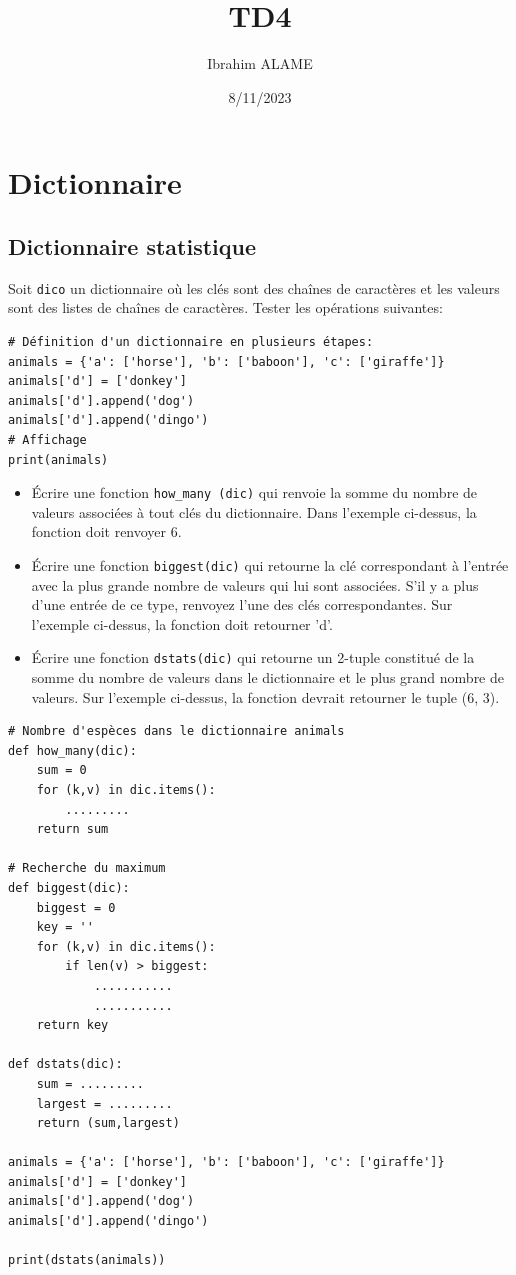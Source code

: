 \documentclass[a4paper]{article}
\title{TD4}
\author{Ibrahim ALAME}
\date{8/11/2023}
\begin{document}
\maketitle
\section{Dictionnaire}
\subsection{Dictionnaire statistique}
 Soit {\tt dico} un dictionnaire où les clés sont des chaînes de caractères et les valeurs sont des listes de chaînes de caractères. Tester les opérations  suivantes:

\begin{lstlisting}
# Définition d'un dictionnaire en plusieurs étapes:
animals = {'a': ['horse'], 'b': ['baboon'], 'c': ['giraffe']}
animals['d'] = ['donkey']
animals['d'].append('dog')
animals['d'].append('dingo')
# Affichage
print(animals)
\end{lstlisting}
\begin{itemize}
\item Écrire une fonction {\tt how\_many (dic)} qui renvoie la somme du nombre de valeurs associées à tout
clés du dictionnaire. Dans l'exemple ci-dessus, la fonction doit renvoyer 6.
\item Écrire une fonction {\tt biggest(dic)} qui retourne la clé correspondant à l'entrée avec la plus grande
nombre de valeurs qui lui sont associées. S'il y a plus d'une entrée de ce type, renvoyez l'une des
clés correspondantes. Sur l'exemple ci-dessus, la fonction doit retourner 'd'.
\item Écrire une fonction {\tt dstats(dic)} qui retourne un 2-tuple constitué de la somme du nombre de valeurs
dans le dictionnaire et le plus grand nombre de valeurs. Sur l'exemple ci-dessus, la fonction
devrait retourner le tuple (6, 3).
\end{itemize}
\begin{lstlisting}
# Nombre d'espèces dans le dictionnaire animals
def how_many(dic):
    sum = 0
    for (k,v) in dic.items():
        .........
    return sum

# Recherche du maximum
def biggest(dic):
    biggest = 0
    key = ''
    for (k,v) in dic.items():
        if len(v) > biggest:
            ...........
            ...........
    return key

def dstats(dic):
    sum = .........
    largest = .........
    return (sum,largest)

animals = {'a': ['horse'], 'b': ['baboon'], 'c': ['giraffe']}
animals['d'] = ['donkey']
animals['d'].append('dog')
animals['d'].append('dingo')

print(dstats(animals))
\end{lstlisting}
\end{document}
